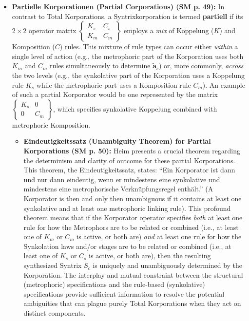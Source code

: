 \documentclass[12pt]{article}
\newcommand{\q}[1]{\enquote{#1}}
\newcommand{\metrophor}{\bm{\widetilde{a}}}
\newcommand{\korporatoroperator}{\begin{Bmatrix} K_s & C_s \\ K_m & C_m \end{Bmatrix}}
\begin{document}
\begin{itemize}
    \item \textbf{Partielle Korporationen (Partial Corporations) (SM p. 49):}
    In contrast to Total Korporations, a Syntrixkorporation is termed \textbf{partiell} if its \( 2 \times 2 \) operator matrix \( \korporatoroperator \) employs a \textit{mix} of Koppelung (\( K \)) and Komposition (\( C \)) rules. This mixture of rule types can occur either \textit{within} a single level of action (e.g., the metrophoric part of the Korporation uses both \( K_m \) and \( C_m \) rules simultaneously to determine \( \metrophor_c \)) or, more commonly, \textit{across} the two levels (e.g., the synkolative part of the Korporation uses a Koppelung rule \( K_s \) while the metrophoric part uses a Komposition rule \( C_m \)). An example of such a partial Korporator would be one represented by the matrix \( \begin{Bmatrix} K_s & 0 \\ 0 & C_m \end{Bmatrix} \), which specifies synkolative Koppelung combined with metrophoric Komposition.

    \begin{itemize}
        \item \textbf{Eindeutigkeitssatz (Unambiguity Theorem) for Partial Korporations (SM p. 50):}
        Heim presents a crucial theorem regarding the determinism and clarity of outcome for these partial Korporations. This theorem, the Eindeutigkeitssatz, states: \q{Ein Korporator ist dann und nur dann eindeutig, wenn er mindestens eine synkolative und mindestens eine metrophorische Verknüpfungsregel enthält.} (A Korporator is then and only then unambiguous if it contains at least one synkolative and at least one metrophoric linking rule).
        This profound theorem means that if the Korporator operator specifies \textit{both} at least one rule for how the Metrophors are to be related or combined (i.e., at least one of \( K_m \) or \( C_m \) is active, or both are) \textit{and} at least one rule for how the Synkolation laws and/or stages are to be related or combined (i.e., at least one of \( K_s \) or \( C_s \) is active, or both are), then the resulting synthesized Syntrix \( S_c \) is uniquely and unambiguously determined by the Korporation. The interplay and mutual constraint between the structural (metrophoric) specifications and the rule-based (synkolative) specifications provide sufficient information to resolve the potential ambiguities that can plague purely Total Korporations when they act on distinct components.
    \end{itemize}


\end{itemize}
\end{document}
